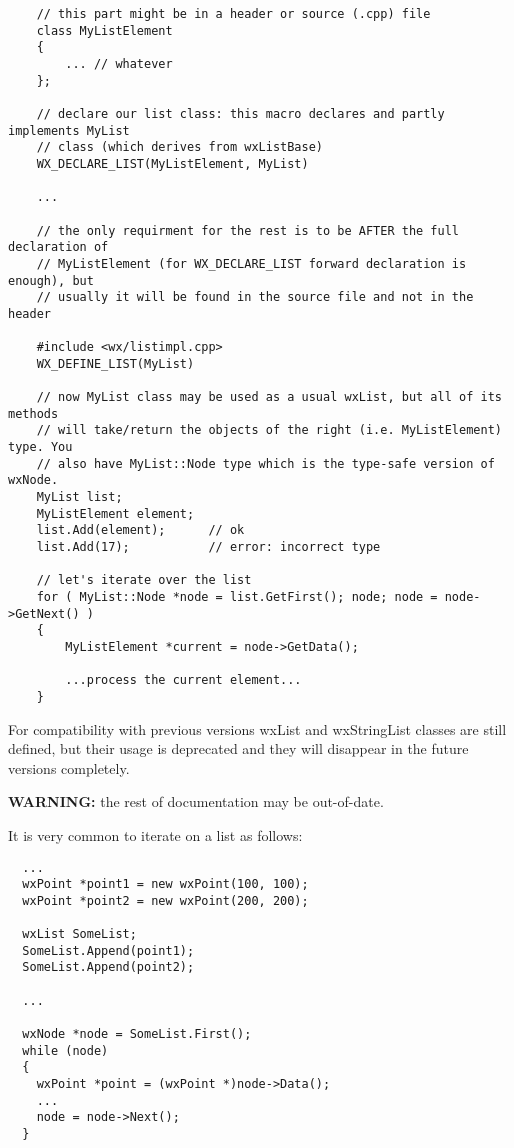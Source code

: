 {\small%
\begin{verbatim}
    // this part might be in a header or source (.cpp) file
    class MyListElement
    {
        ... // whatever
    };

    // declare our list class: this macro declares and partly implements MyList
    // class (which derives from wxListBase)
    WX_DECLARE_LIST(MyListElement, MyList)

    ...

    // the only requirment for the rest is to be AFTER the full declaration of
    // MyListElement (for WX_DECLARE_LIST forward declaration is enough), but
    // usually it will be found in the source file and not in the header

    #include <wx/listimpl.cpp>
    WX_DEFINE_LIST(MyList)

    // now MyList class may be used as a usual wxList, but all of its methods
    // will take/return the objects of the right (i.e. MyListElement) type. You
    // also have MyList::Node type which is the type-safe version of wxNode.
    MyList list;
    MyListElement element;
    list.Add(element);      // ok
    list.Add(17);           // error: incorrect type

    // let's iterate over the list
    for ( MyList::Node *node = list.GetFirst(); node; node = node->GetNext() )
    {
        MyListElement *current = node->GetData();

        ...process the current element...
    }
\end{verbatim}
}

For compatibility with previous versions wxList and wxStringList classes are
still defined, but their usage is deprecated and they will disappear in the
future versions completely.



{\bf WARNING: } the rest of documentation may be out-of-date.


It is very common to iterate on a list as follows:

\begin{verbatim}
  ...
  wxPoint *point1 = new wxPoint(100, 100);
  wxPoint *point2 = new wxPoint(200, 200);

  wxList SomeList;
  SomeList.Append(point1);
  SomeList.Append(point2);

  ...

  wxNode *node = SomeList.First();
  while (node)
  {
    wxPoint *point = (wxPoint *)node->Data();
    ...
    node = node->Next();
  }
\end{verbatim}

